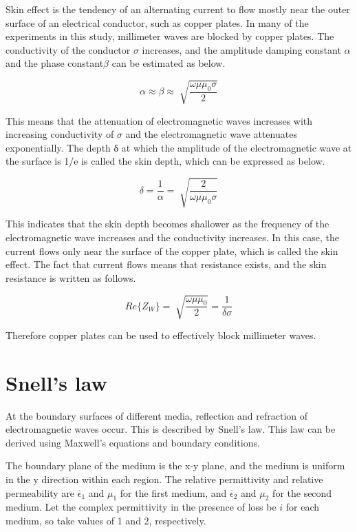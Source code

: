 \documentclass[a4paper,12pt]{report}
\begin{document}
Skin effect is the tendency of an alternating current to flow mostly near
the outer surface of an electrical conductor, such as copper plates.
In many of the experiments in this study, 
millimeter waves are blocked by copper plates.
The conductivity of the conductor $\sigma$ increases,
and the amplitude damping constant $\alpha$ and the phase constant$\beta$
can be estimated as below.

\begin{equation}
  \alpha \approx \beta \approx \sqrt[]{\frac{\omega\mu\mu_0\sigma}{2}}
\end{equation}

This means that the attenuation of electromagnetic waves increases with increasing conductivity of $\sigma$
and the electromagnetic wave attenuates exponentially.
The depth δ at which the amplitude of the electromagnetic wave
at the surface is 1/e is called the skin depth, which can be expressed as below.

\begin{equation}
  \delta = \frac{1}{\alpha} = \sqrt[]{\frac{2}{\omega\mu\mu_0\sigma}}
\end{equation}

This indicates that the skin depth becomes shallower
as the frequency of the electromagnetic wave increases and the conductivity increases.
In this case, the current flows only near the surface of the copper plate,
which is called the skin effect.
The fact that current flows means that resistance exists,
and the skin resistance is written as follows.

\begin{equation}
  Re\{Z_W\} = \sqrt[]{\frac{\omega\mu\mu_0}{2}} = \frac{1}{\delta\sigma}
\end{equation}

Therefore copper plates can be used to effectively block millimeter waves.

\section{Snell's law}

At the boundary surfaces of different media, reflection and refraction of electromagnetic waves occur.
This is described by Snell's law.
This law can be derived using Maxwell's equations and boundary conditions.

The boundary plane of the medium is the x-y plane,
and the medium is uniform in the y direction within each region.
The relative permittivity and relative permeability are
$\dot{\epsilon_1}$ and $\mu_1$ for the first medium, and
$\dot{\epsilon_2}$ and $\mu_2$ for the second medium.
Let the complex permittivity in the presence of loss be
$i$ for each medium, so take values of 1 and 2, respectively.
\end{document}
